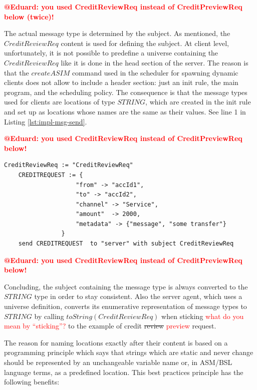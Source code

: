 \textcolor{red}{\bf @Eduard: you used CreditReviewReq  instead of CreditPreviewReq below (twice)!} 

The actual message type is determined by the subject. As mentioned, the $CreditReviewReq$ content is used for defining the subject. At client level, unfortunately, it is not possible to predefine a universe containing the $CreditReviewReq$ like it is done in the head section of the server. The reason is that the $createASIM$ command used in the scheduler for spawning dynamic clients does not allow to include a header section: just an init rule, the main program, and the scheduling policy. The consequence is that the message types used for clients are locations of type $STRING$, which are created in the init rule and set up as locations whose names are the same as their values. See line 1 in Listing \ref{lst:impl-msg-send}.

\textcolor{red}{\bf @Eduard: you used CreditReviewReq  instead of CreditPreviewReq below!} 
\begin{center}
\begin{minipage}{0.8\textwidth}
\small
\begin{lstlisting}[language=bsl_lst,caption={\bf\small send message},label={lst:impl-msg-send} ]
	CreditReviewReq := "CreditReviewReq"
	CREDITREQUEST := {
					"from" -> "accId1",
					"to" -> "accId2",
					"channel" -> "Service",
					"amount"  -> 2000,
					"metadata" -> {"message", "some transfer"}
				}
	send CREDITREQUEST  to "server" with subject CreditReviewReq
\end{lstlisting}
\end{minipage}
\end{center}

\textcolor{red}{\bf @Eduard: you used CreditReviewReq  instead of CreditPreviewReq below!}

Concluding, the subject containing the message type is always converted to the $STRING$ type in order to stay consistent. Also the server agent, which uses a universe definition, converts its enumerative representation of message types to $STRING$ by calling $toString(CreditReviewReq)$ when sticking \textcolor{red}{what do you mean by ``sticking''?} to the example of credit \st{review} \textcolor{red}{preview} request.

The reason for naming locations exactly after their content is based on a programming principle which says that strings which are static and never change should be represented by an unchangeable variable name or, in ASM/BSL language terms, as a predefined location. This best practices principle has the following benefits:

